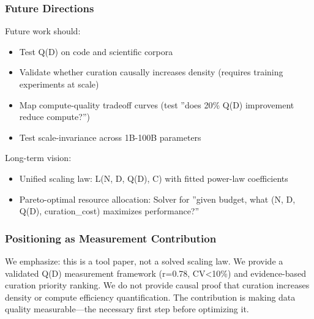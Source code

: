 \subsubsection{Future Directions}

Future work should:
\begin{itemize}
\item Test Q(D) on code and scientific corpora
\item Validate whether curation causally increases density (requires training experiments at scale)
\item Map compute-quality tradeoff curves (test ''does 20\% Q(D) improvement reduce compute?'')
\item Test scale-invariance across 1B-100B parameters
\end{itemize}

Long-term vision:
\begin{itemize}
\item Unified scaling law: L(N, D, Q(D), C) with fitted power-law coefficients
\item Pareto-optimal resource allocation: Solver for ''given budget, what (N, D, Q(D), curation\_cost) maximizes performance?''
\end{itemize}

\subsubsection{Positioning as Measurement Contribution}

We emphasize: this is a tool paper, not a solved scaling law. We provide a validated Q(D) measurement framework (r=0.78, CV<10\%) and evidence-based curation priority ranking. We do not provide causal proof that curation increases density or compute efficiency quantification. The contribution is making data quality measurable---the necessary first step before optimizing it.
